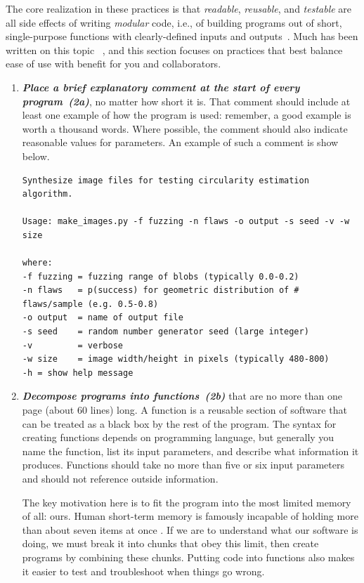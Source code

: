 \documentclass[10pt,letterpaper]{article}
\newcommand{\practice}[2]{\textbf{\emph{{#2}~({#1})}}}
\begin{document}
The core realization in these practices is that \emph{readable},
\emph{reusable}, and \emph{testable} are all side effects of writing
\emph{modular} code, i.e., of building programs out of short,
single-purpose functions with clearly-defined inputs and
outputs~\cite{hunt1999}. Much has been written on this topic 
~\cite{hunt1999,mcconnell2004,martin2008},
and this section focuses on practices that best balance ease of use
with benefit for you and collaborators.

\begin{enumerate}

\item

  \practice{2a}{Place a brief explanatory comment at the start of
  every program}, no matter how short it is. That comment should
  include at least one example of how the program is used: remember, a
  good example is worth a thousand words. Where possible, the comment
  should also indicate reasonable values for parameters.  An example
  of such a comment is show below.

{\small
\begin{verbatim}
Synthesize image files for testing circularity estimation algorithm.

Usage: make_images.py -f fuzzing -n flaws -o output -s seed -v -w size

where:
-f fuzzing = fuzzing range of blobs (typically 0.0-0.2)
-n flaws   = p(success) for geometric distribution of # flaws/sample (e.g. 0.5-0.8)
-o output  = name of output file
-s seed    = random number generator seed (large integer)
-v         = verbose
-w size    = image width/height in pixels (typically 480-800)
-h = show help message
\end{verbatim}
}

\item

  \practice{2b}{Decompose programs into functions} that are no more
  than one page (about 60 lines) long. A function is a reusable
  section of software that can be treated as a black box by the rest
  of the program. The syntax for creating functions depends on
  programming language, but generally you name the function, list its
  input parameters, and describe what information it produces.
  Functions should take no more than five or six input parameters and
  should not reference outside information.

  The key motivation here is to fit the program into the most limited
  memory of all: ours. Human short-term memory is famously incapable
  of holding more than about seven items at once \cite{miller1956}. If
  we are to understand what our software is doing, we must break it
  into chunks that obey this limit, then create programs by combining
  these chunks. Putting code into functions also makes it easier to
  test and troubleshoot when things go wrong.


\end{enumerate}
\end{document}
